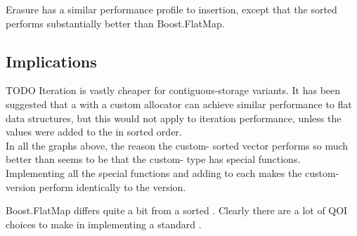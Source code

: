Erasure has a similar performance profile to insertion, except that the sorted
 performs substantially better than
Boost.FlatMap.\\


\subsection{Implications}

TODO Iteration is vastly cheaper for contiguous-storage variants.  It has been
suggested that a  with a custom allocator can achieve similar
performance to flat data structures, but this would not apply to iteration
performance, unless the values were added to the  in sorted order.\\

In all the graphs above, the reason the custom- sorted vector
performs so much better than  seems to be that
the custom- type has  special functions.
Implementing all the special functions and adding  to
each makes the custom- version perform identically to the
 version.

Boost.FlatMap differs quite a bit from a sorted .  Clearly there
are a lot of QOI choices to make in implementing a standard .
